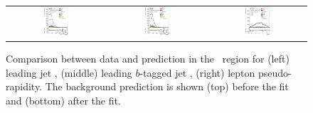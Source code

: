 \begin{figure}[tp]
\begin{tabular}{ccc}
  \includegraphics[width=0.27\textwidth]{Analysis/Figures_ttH/tesis_vars/postfit/jet1_pt_4jetex3btagex.eps} &
  \includegraphics[width=0.27\textwidth]{Analysis/Figures_ttH/tesis_vars/postfit/bjet1_pt_4jetex3btagex.eps} &
  \includegraphics[width=0.27\textwidth]{Analysis/Figures_ttH/tesis_vars/postfit/lep_eta_4jetex3btagex.eps} \\
\end{tabular}
\caption{Comparison between data and prediction in the \fourthree\ region for (left) leading jet \pt, (middle) leading $b$-tagged jet \pt, (right) lepton pseudo-rapidity. The background prediction is shown (top) before the fit and (bottom) after the fit.}
  \label{fig:vars2_fourthree}
\end{figure}
